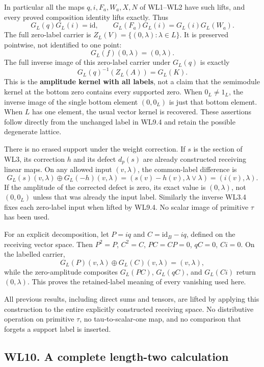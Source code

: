 In particular all the maps \(q,i,F_a,W_a,X,N\) of WL1--WL2 have such
lifts, and every proved composition identity lifts exactly. Thus \[
 G_L(q)G_L(i)=\mathrm{id},\qquad
 G_L(F_a)G_L(i)=G_L(i)G_L(W_a).
\tag{WL9.6}
\] The full zero-label carrier is
\(Z_L(V)=\{(0,\lambda):\lambda\in L\}\). It is preserved pointwise, not
identified to one point: \[
 G_L(f)(0,\lambda)=(0,\lambda).
\tag{WL9.7}
\] The full inverse image of this zero-label carrier under \(G_L(q)\) is
exactly \[
 G_L(q)^{-1}(Z_L(A))=G_L(K).
\tag{WL9.8}
\] This is the \textbf{amplitude kernel with all labels}, not a claim
that the semimodule kernel at the bottom zero contains every supported
zero. When \(0_L\ne1_L\), the inverse image of the single bottom element
\((0,0_L)\) is just that bottom element. When \(L\) has one element, the
usual vector kernel is recovered. These assertions follow directly from
the unchanged label in WL9.4 and retain the possible degenerate lattice.

There is no erased support under the weight correction. If \(s\) is the
section of WL3, its correction \(h\) and its defect \(d_p(s)\) are
already constructed receiving linear maps. On any allowed input
\((v,\lambda)\), the common-label difference is \[
 G_L(s)(v,\lambda)\oplus G_L(-h)(v,\lambda)
 =(s(v)-h(v),\lambda\vee\lambda)
 =(i(v),\lambda).
\tag{WL9.9}
\] If the amplitude of the corrected defect is zero, its exact value is
\((0,\lambda)\), not \((0,0_L)\) unless that was already the input
label. Similarly the inverse WL3.4 fixes each zero-label input when
lifted by WL9.4. No scalar image of primitive \(\tau\) has been used.

For an explicit decomposition, let \(P=iq\) and \(C=\mathrm{id}_B-iq\),
defined on the receiving vector space. Then \(P^2=P\), \(C^2=C\),
\(PC=CP=0\), \(qC=0\), \(Ci=0\). On the labelled carrier, \[
 G_L(P)(v,\lambda)\oplus G_L(C)(v,\lambda)=(v,\lambda),
\] while the zero-amplitude composites \(G_L(PC)\), \(G_L(qC)\), and
\(G_L(Ci)\) return \((0,\lambda)\). This proves the retained-label
meaning of every vanishing used here.

All previous results, including direct sums and tensors, are lifted by
applying this construction to the entire explicitly constructed
receiving space. No distributive operation on primitive \(\tau\), no
tau-to-scalar-one map, and no comparison that forgets a support label is
inserted.

\subsection{WL10. A complete length-two
calculation}\label{wl10.-a-complete-length-two-calculation}

